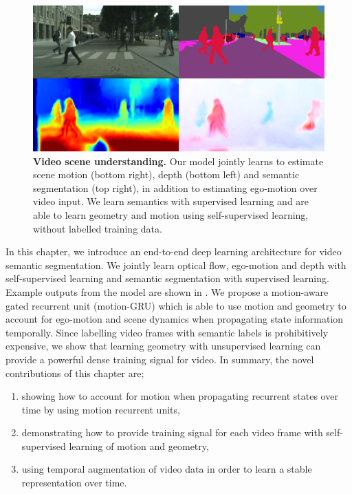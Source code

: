 \begin{figure}[t]
\begin{center}
\includegraphics[width=0.7\columnwidth,trim={7mm 12mm 7mm 5mm},clip]{videosegnet.png}
\end{center}
   \vspace{-5mm}
   \caption[Video scene understanding.]{\textbf{Video scene understanding.} Our model jointly learns to estimate scene motion (bottom right), depth (bottom left) and semantic segmentation (top right), in addition to estimating ego-motion over video input. We learn semantics with supervised learning and are able to learn geometry and motion using self-supervised learning, without labelled training data.} %
\label{fig:video_teaser}
   \vspace{-5mm}
\end{figure}

In this chapter, we introduce an end-to-end deep learning architecture for video semantic segmentation. We jointly learn optical flow, ego-motion and depth with self-supervised learning and semantic segmentation with supervised learning. Example outputs from the model are shown in . We propose a motion-aware gated recurrent unit (motion-GRU) which is able to use motion and geometry to account for ego-motion and scene dynamics when propagating state information temporally. Since labelling video frames with semantic labels is prohibitively expensive, we show that learning geometry with unsupervised learning can provide a powerful dense training signal for video. In summary, the novel contributions of this chapter are;
\begin{enumerate}%
\item showing how to account for motion when propagating recurrent states over time by using motion recurrent units,
\item demonstrating how to provide training signal for each video frame with self-supervised learning of motion and geometry,
\item using temporal augmentation of video data in order to learn a stable representation over time.
\end{enumerate}

